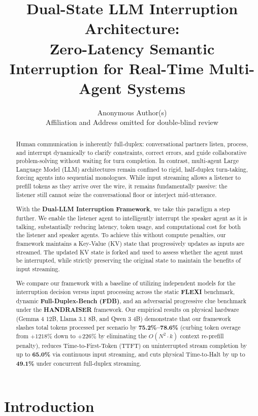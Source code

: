 \documentclass{article}
\title{Dual-State LLM Interruption Architecture: \\ Zero-Latency Semantic Interruption for Real-Time Multi-Agent Systems}
\author{%
  Anonymous Author(s) \\
  Affiliation and Address omitted for double-blind review \\
}
\begin{document}
\maketitle

\begin{abstract}
Human communication is inherently full-duplex: conversational partners listen, process, and interrupt dynamically to clarify constraints, correct errors, and guide collaborative problem-solving without waiting for turn completion. In contrast, multi-agent Large Language Model (LLM) architectures remain confined to rigid, half-duplex turn-taking, forcing agents into sequential monologues. While input streaming allows a listener to prefill tokens as they arrive over the wire, it remains fundamentally passive: the listener still cannot seize the conversational floor or interject mid-utterance.

With the \textbf{Dual-LLM Interruption Framework}, we take this paradigm a step further. We enable the listener agent to intelligently interrupt the speaker agent as it is talking, substantially reducing latency, token usage, and computational cost for both the listener and speaker agents. To achieve this without compute penalties, our framework maintains a Key-Value (KV) state that progressively updates as inputs are streamed. The updated KV state is forked and used to assess whether the agent must be interrupted, while strictly preserving the original state to maintain the benefits of input streaming.

We compare our framework with a baseline of utilizing independent models for the interruption decision versus input processing across the static \textbf{FLEXI} benchmark, dynamic \textbf{Full-Duplex-Bench (FDB)}, and an adversarial progressive clue benchmark under the \textbf{HANDRAISER} framework. Our empirical results on physical hardware (Gemma 4 12B, Llama 3.1 8B, and Qwen 3 4B) demonstrate that our framework slashes total tokens processed per scenario by \textbf{75.2\%--78.6\%} (curbing token overage from $+1218\%$ down to $+226\%$ by eliminating the $O(N^2 \cdot k)$ context re-prefill penalty), reduces Time-to-First-Token (TTFT) on uninterrupted stream completion by up to \textbf{65.0\%} via continuous input streaming, and cuts physical Time-to-Halt by up to \textbf{49.1\%} under concurrent full-duplex streaming.
\end{abstract}

\section{Introduction}
\end{document}
